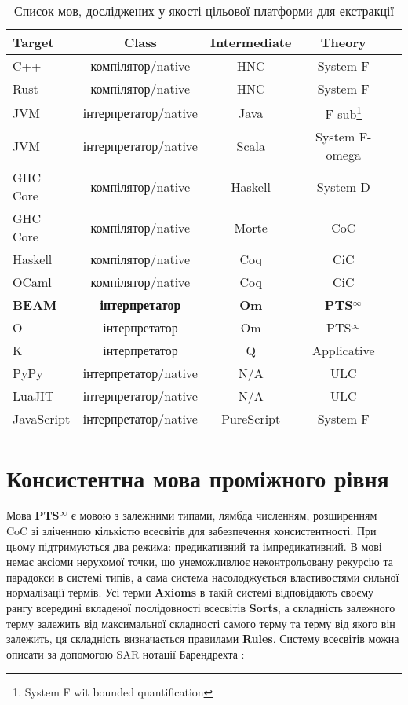\documentclass{article}
\begin{document}
\begin{table}[h]
\begin{center}
\caption{Список мов, досліджених у якості цільової платформи для екстракції}
\label{tab:a}
\begin{tabular}{lcccc}
\hline
{\bf Target} & {\bf Class} & {\bf Intermediate} & {\bf Theory}\\
\hline
C++        & компілятор/native      & HNC & System F\\
Rust       & компілятор/native      & HNC & System F\\
JVM        & інтерпретатор/native   & Java    & F-sub\footnote{System F wit bounded quantification}\\
JVM        & інтерпретатор/native   & Scala   & System F-omega\\
GHC Core   & компілятор/native      & Haskell & System D\\
GHC Core   & компілятор/native      & Morte   & CoC\\
Haskell    & компілятор/native      & Coq     & CiC\\
OCaml      & компілятор/native      & Coq     & CiC\\
{\bf BEAM} & {\bf інтерпретатор} & {\bf Om}   & {\bf PTS$^\infty$} \\
O          & інтерпретатор          & Om  & PTS$^\infty$ \\
K          & інтерпретатор          & Q   & Applicative \\
PyPy       & інтерпретатор/native   & N/A & ULC \\
LuaJIT     & інтерпретатор/native   & N/A & ULC \\
JavaScript & інтерпретатор/native & PureScript & System F\\
\hline
\end{tabular}
\end{center}
\end{table}

\section{Консистентна мова проміжного рівня}
Мова \textbf{PTS$^\infty$} є мовою з залежними типами, лямбда численням, розширенням CoC зі зліченною кількістю всесвітів для забезпечення консистентності.
При цьому підтримуються два режима: предикативний та імпредикативний. В мові немає аксіоми нерухомої точки, що унеможливлює неконтрольовану рекурсію та парадокси в системі типів,
а сама система насолоджується властивостями сильної нормалізації термів.
Усі терми {\bf Axioms} в такій системі відповідають своєму рангу всередині вкладеної послідовності всесвітів {\bf Sorts},
а складність залежного терму залежить від максимальної складності самого терму та терму від якого він залежить, ця складність визначається
правилами {\bf Rules}. Систему всесвітів можна описати за допомогою SAR нотації Барендрехта \cite{Henk93}:
\end{document}
